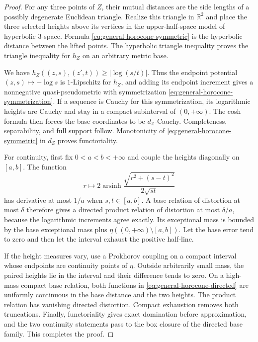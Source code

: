 \documentclass{amsart}
\numberwithin{equation}{section}
\theoremstyle{plain}
\theoremstyle{definition}
\theoremstyle{remark}
\newcommand{\R}{\mathbb R}
\DeclareMathOperator{\arsinh}{arsinh}
\begin{document}
\begin{proof}
For any three points of $Z$, their mutual distances are the side lengths of a possibly degenerate Euclidean triangle.  Realize this triangle in $\R^2$ and place the three selected heights above its vertices in the upper-half-space model of hyperbolic $3$-space.  Formula \eqref{eq:general-horocone-symmetric} is the hyperbolic distance between the lifted points.  The hyperbolic triangle inequality proves the triangle inequality for $h_Z$ on an arbitrary metric base.

We have $h_Z((z,s),(z',t))\ge|\log(s/t)|$.  Thus the endpoint potential $(z,s)\mapsto-\log s$ is $1$-Lipschitz for $h_Z$, and adding its endpoint increment gives a nonnegative quasi-pseudometric with symmetrization \eqref{eq:general-horocone-symmetrization}.  If a sequence is Cauchy for this symmetrization, its logarithmic heights are Cauchy and stay in a compact subinterval of $(0,+\infty)$.  The cosh formula then forces the base coordinates to be $d_Z$-Cauchy.  Completeness, separability, and full support follow.  Monotonicity of \eqref{eq:general-horocone-symmetric} in $d_Z$ proves functoriality.

For continuity, first fix $0<a<b<+\infty$ and couple the heights diagonally on $[a,b]$.  The function
\[ r\longmapsto2\arsinh \frac{\sqrt{r^2+(s-t)^2}}{2\sqrt{st}} \]
has derivative at most $1/a$ when $s,t\in[a,b]$.  A base relation of distortion at most $\delta$ therefore gives a directed product relation of distortion at most $\delta/a$, because the logarithmic increments agree exactly.  Its exceptional mass is bounded by the base exceptional mass plus $\eta((0,+\infty)\setminus[a,b])$.  Let the base error tend to zero and then let the interval exhaust the positive half-line.

If the height measures vary, use a Prokhorov coupling on a compact interval whose endpoints are continuity points of $\eta$.  Outside arbitrarily small mass, the paired heights lie in the interval and their difference tends to zero.  On a high-mass compact base relation, both functions in \eqref{eq:general-horocone-directed} are uniformly continuous in the base distance and the two heights.  The product relation has vanishing directed distortion.  Compact exhaustion removes both truncations.  Finally, functoriality gives exact domination before approximation, and the two continuity statements pass to the box closure of the directed base family.  This completes the proof.
\end{proof}
\end{document}
